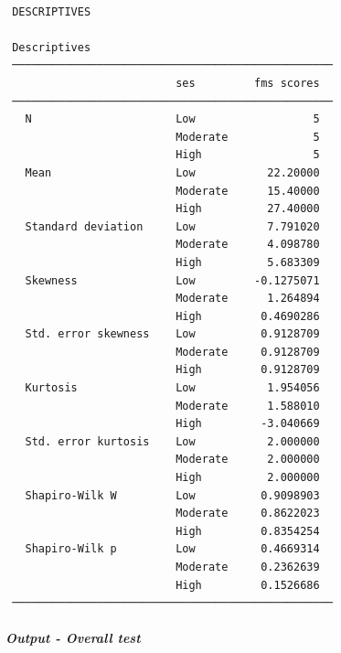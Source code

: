 \documentclass[
]{article}
\begin{document}
\begin{verbatim}

 DESCRIPTIVES

 Descriptives                                      
 ───────────────────────────────────────────────── 
                          ses         fms scores   
 ───────────────────────────────────────────────── 
   N                      Low                  5   
                          Moderate             5   
                          High                 5   
   Mean                   Low           22.20000   
                          Moderate      15.40000   
                          High          27.40000   
   Standard deviation     Low           7.791020   
                          Moderate      4.098780   
                          High          5.683309   
   Skewness               Low         -0.1275071   
                          Moderate      1.264894   
                          High         0.4690286   
   Std. error skewness    Low          0.9128709   
                          Moderate     0.9128709   
                          High         0.9128709   
   Kurtosis               Low           1.954056   
                          Moderate      1.588010   
                          High         -3.040669   
   Std. error kurtosis    Low           2.000000   
                          Moderate      2.000000   
                          High          2.000000   
   Shapiro-Wilk W         Low          0.9098903   
                          Moderate     0.8622023   
                          High         0.8354254   
   Shapiro-Wilk p         Low          0.4669314   
                          Moderate     0.2362639   
                          High         0.1526686   
 ───────────────────────────────────────────────── 
\end{verbatim}

\hypertarget{output---overall-test}{%
\subparagraph{Output - Overall test}\label{output---overall-test}}
\end{document}
